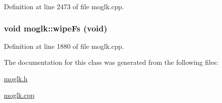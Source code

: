 Definition at line 2473 of file moglk.cpp.\hypertarget{classmoglk_de1cb00a156f01b9948b7ade18a6754b}{
\subsubsection[{wipeFs}]{\setlength{\rightskip}{0pt plus 5cm}void moglk::wipeFs (void)}}
\label{classmoglk_de1cb00a156f01b9948b7ade18a6754b}




Definition at line 1880 of file moglk.cpp.

The documentation for this class was generated from the following files:\begin{CompactItemize}
\item 
\hyperlink{moglk_8h}{moglk.h}\item 
\hyperlink{moglk_8cpp}{moglk.cpp}\end{CompactItemize}
